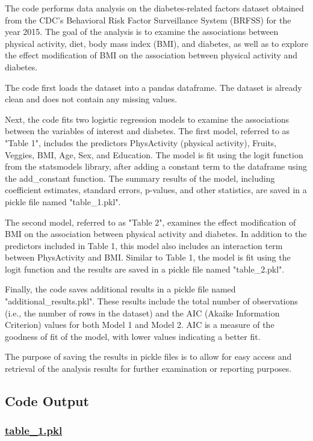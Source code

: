 \documentclass[11pt]{article}
\begin{document}
The code performs data analysis on the diabetes-related factors dataset obtained from the CDC's Behavioral Risk Factor Surveillance System (BRFSS) for the year 2015. The goal of the analysis is to examine the associations between physical activity, diet, body mass index (BMI), and diabetes, as well as to explore the effect modification of BMI on the association between physical activity and diabetes.

The code first loads the dataset into a pandas dataframe. The dataset is already clean and does not contain any missing values.

Next, the code fits two logistic regression models to examine the associations between the variables of interest and diabetes. The first model, referred to as "Table 1", includes the predictors PhysActivity (physical activity), Fruits, Veggies, BMI, Age, Sex, and Education. The model is fit using the logit function from the statsmodels library, after adding a constant term to the dataframe using the add\_constant function. The summary results of the model, including coefficient estimates, standard errors, p-values, and other statistics, are saved in a pickle file named "table\_1.pkl".

The second model, referred to as "Table 2", examines the effect modification of BMI on the association between physical activity and diabetes. In addition to the predictors included in Table 1, this model also includes an interaction term between PhysActivity and BMI. Similar to Table 1, the model is fit using the logit function and the results are saved in a pickle file named "table\_2.pkl".

Finally, the code saves additional results in a pickle file named "additional\_results.pkl". These results include the total number of observations (i.e., the number of rows in the dataset) and the AIC (Akaike Information Criterion) values for both Model 1 and Model 2. AIC is a measure of the goodness of fit of the model, with lower values indicating a better fit.

The purpose of saving the results in pickle files is to allow for easy access and retrieval of the analysis results for further examination or reporting purposes.

\subsection{Code Output}\hypertarget{file-table-1-pkl}{}

\subsubsection*{\hyperlink{code-Data Analysis-table-1-pkl}{table\_1.pkl}}
\end{document}
